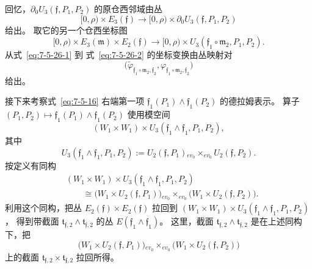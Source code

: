 回忆，$\partial_0U_3(\mathfrak f,P_1,P_2)$
的原仓西邻域由丛
\begin{equation}
[0,\rho)\times E_3(\mathfrak f)
\longrightarrow
[0,\rho)\times\partial_0U_3(\mathfrak f,P_1,P_2)
\tag{7.5.26.1}\label{eq:7-5-26-1}
\end{equation}
给出。
取它的另一个仓西坐标图
\begin{equation}
[0,\rho)\times E_3(\mathfrak m)\times E_2(\mathfrak f)
\longrightarrow
[0,\rho)\times
U_3(\mathfrak f_1\circ\mathfrak m_2,P_1,P_2).
\tag{7.5.26.2}\label{eq:7-5-26-2}
\end{equation}
从式~\eqref{eq:7-5-26-1} 到
式~\eqref{eq:7-5-26-2} 的坐标变换由丛映射对
\[
\bigl(
\widetilde\varphi_{\mathfrak f_1\circ\mathfrak m_2,\mathfrak f_2},
\varphi_{\mathfrak f_1\circ\mathfrak m_2,\mathfrak f_2}
\bigr)
\]
给出。

接下来考察式~\eqref{eq:7-5-16} 右端第一项
$\mathfrak f_1(P_1)\wedge\mathfrak f_1(P_2)$ 的德拉姆表示。
算子
$(P_1,P_2)\mapsto
\mathfrak f_1(P_1)\wedge\mathfrak f_1(P_2)$
使用模空间
\[
(W_1\times W_1)\times
U_3(\mathfrak f_1\wedge\mathfrak f_1,P_1,P_2),
\]
其中
\[
U_3(\mathfrak f_1\wedge\mathfrak f_1,P_1,P_2)
:=U_2(\mathfrak f,P_1)
{}_{ev_0}\!\mathbin{\times_{ev_0}}U_2(\mathfrak f,P_2).
\]
按定义有同构
\[
\begin{aligned}
&(W_1\times W_1)\times
U_3(\mathfrak f_1\wedge\mathfrak f_1,P_1,P_2)\\
&\qquad\cong
\bigl(W_1\times U_2(\mathfrak f,P_1)\bigr)
{}_{ev_0}\!\mathbin{\times_{ev_0}}
\bigl(W_1\times U_2(\mathfrak f,P_2)\bigr).
\end{aligned}
\]
利用这个同构，把丛
$E_2(\mathfrak f)\times E_2(\mathfrak f)$
拉回到
$(W_1\times W_1)\times
U_3(\mathfrak f_1\wedge\mathfrak f_1,P_1,P_2)$，
得到带截面
$\mathfrak t_{\mathfrak f,2}\wedge\mathfrak t_{\mathfrak f,2}$
的丛 $E(\mathfrak f_1\wedge\mathfrak f_1)$。
这里，截面
$\mathfrak t_{\mathfrak f,2}\wedge\mathfrak t_{\mathfrak f,2}$
是在上述同构下，把
\[
\bigl(W_1\times U_2(\mathfrak f,P_1)\bigr)
{}_{ev_0}\!\mathbin{\times_{ev_0}}
\bigl(W_1\times U_2(\mathfrak f,P_2)\bigr)
\]
上的截面
$\mathfrak t_{\mathfrak f,2}\times\mathfrak t_{\mathfrak f,2}$
拉回所得。

